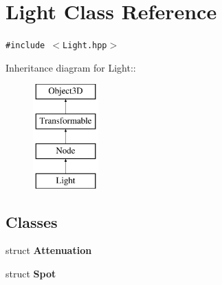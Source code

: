 \hypertarget{classm3g_1_1Light}{
\section{Light Class Reference}
\label{classm3g_1_1Light}
}
{\tt \#include $<$Light.hpp$>$}

Inheritance diagram for Light::\begin{figure}[H]
\begin{center}
\leavevmode
\includegraphics[height=4cm]{classm3g_1_1Light}
\end{center}
\end{figure}
\subsection*{Classes}
\begin{CompactItemize}
\item 
struct \textbf{Attenuation}
\item 
struct \textbf{Spot}
\end{CompactItemize}

